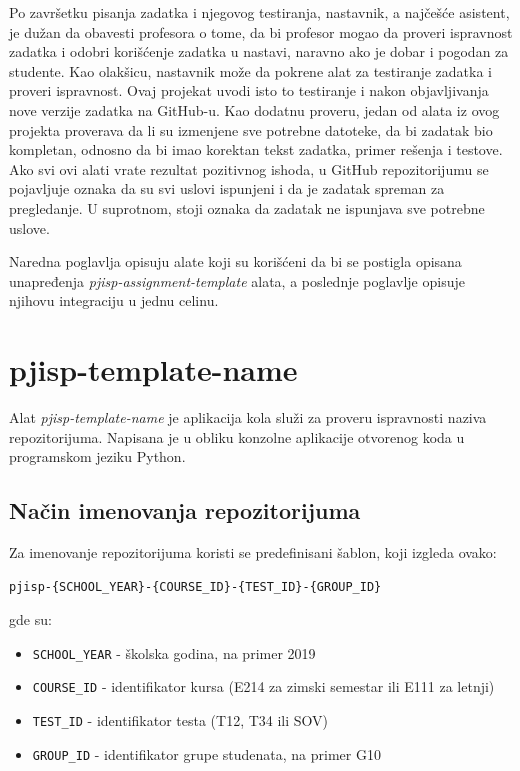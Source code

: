 \documentclass[12pt]{report}
\begin{document}
Po završetku pisanja zadatka i njegovog testiranja, nastavnik, a najčešće asistent, je dužan da obavesti profesora o tome, da bi profesor mogao da proveri ispravnost zadatka i odobri korišćenje zadatka u nastavi, naravno ako je dobar i pogodan za studente. Kao olakšicu, nastavnik može da pokrene alat za testiranje zadatka i proveri ispravnost. Ovaj projekat uvodi isto to testiranje i nakon objavljivanja nove verzije zadatka na GitHub-u. Kao dodatnu proveru, jedan od alata iz ovog projekta proverava da li su izmenjene sve potrebne datoteke, da bi zadatak bio kompletan, odnosno da bi imao korektan tekst zadatka, primer rešenja i testove. Ako svi ovi alati vrate rezultat pozitivnog ishoda, u GitHub repozitorijumu se pojavljuje oznaka da su svi uslovi ispunjeni i da je zadatak spreman za pregledanje. U suprotnom, stoji oznaka da zadatak ne ispunjava sve potrebne uslove.

Naredna poglavlja opisuju alate koji su korišćeni da bi se postigla opisana unapređenja \textit{pjisp-assignment-template} alata, a poslednje poglavlje opisuje njihovu integraciju u jednu celinu.

\section{pjisp-template-name}
Alat \textit{pjisp-template-name} \cite{pjisp-template-name} je aplikacija kola služi za proveru ispravnosti naziva repozitorijuma. Napisana je u obliku konzolne aplikacije otvorenog koda u programskom jeziku Python.

\subsection{Način imenovanja repozitorijuma}
Za imenovanje repozitorijuma koristi se predefinisani šablon, koji izgleda ovako:

\begin{verbatim}
pjisp-{SCHOOL_YEAR}-{COURSE_ID}-{TEST_ID}-{GROUP_ID}
\end{verbatim}

gde su:

\begin{itemize}
    \item \texttt{{SCHOOL\_YEAR}} - školska godina, na primer 2019
    \item \texttt{{COURSE\_ID}} - identifikator kursa (E214 za zimski semestar ili E111 za letnji)
    \item \texttt{{TEST\_ID}} - identifikator testa (T12, T34 ili SOV)
    \item \texttt{{GROUP\_ID}} - identifikator grupe studenata, na primer G10
\end{itemize}
\end{document}
